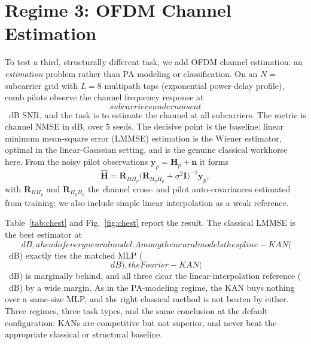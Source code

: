 \documentclass[final,5p,times]{elsarticle}
\begin{document}
\section{Regime 3: OFDM Channel Estimation}\label{sec:chest}
To test a third, structurally different task, we add OFDM channel estimation: an
\emph{estimation} problem rather than PA modeling or classification. On an $N{=}$
subcarrier grid with $L{=}8$ multipath taps (exponential power-delay profile), comb pilots
observe the channel frequency response at $$ subcarriers under noise
at $$~dB SNR, and the task is to estimate the channel at all
subcarriers. The metric is channel NMSE in dB, over $5$ seeds. The decisive point is the
baseline: linear minimum mean-square error (LMMSE) estimation is the Wiener estimator, optimal
in the linear-Gaussian setting, and is the genuine classical workhorse here. From the noisy
pilot observations $\mathbf{y}_p=\mathbf{H}_p+\mathbf{n}$ it forms
\begin{equation}
\hat{\mathbf{H}}=\mathbf{R}_{H H_p}\bigl(\mathbf{R}_{H_p H_p}+\sigma^2\mathbf{I}\bigr)^{-1}\mathbf{y}_p,
\label{eq:lmmse}
\end{equation}
with $\mathbf{R}_{H H_p}$ and $\mathbf{R}_{H_p H_p}$ the channel cross- and pilot
auto-covariances estimated from training; we also include simple linear interpolation as a weak
reference.

Table~\ref{tab:chest} and Fig.~\ref{fig:chest} report the result. The classical LMMSE is the
best estimator at $$~dB, ahead of every neural model. Among the
neural models the spline-KAN ($$~dB) exactly ties the matched
MLP ($$~dB), the Fourier-KAN
($$~dB) is marginally behind, and all three clear the
linear-interpolation reference ($$~dB) by a wide margin. As
in the PA-modeling regime, the KAN buys nothing over a same-size MLP, and the right classical
method is not beaten by either. Three regimes, three task types, and the same conclusion at the
default configuration: KANs are competitive but not superior, and never beat the appropriate
classical or structural baseline.
\end{document}
